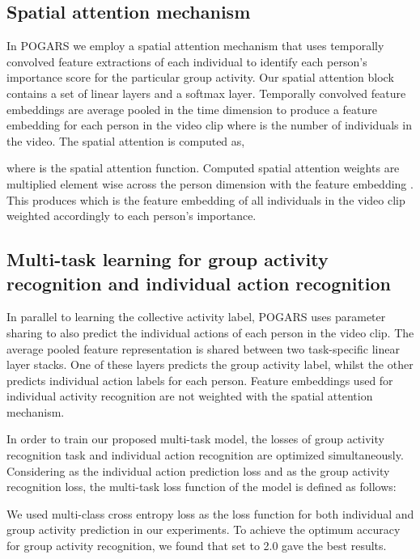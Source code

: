 \documentclass[a4paper,fleqn]{cas-dc}
\begin{document}
\subsection{Spatial attention mechanism}
\label{ssec:spatial-attention-mechanism}

In POGARS we employ a spatial attention mechanism that uses temporally convolved feature extractions of each individual to identify each person's importance score for the particular group activity.
Our spatial attention block contains a set of linear layers and a softmax layer.
Temporally convolved feature embeddings  are average pooled in the time dimension to produce a feature embedding for each person in the video clip {} where  is the number of individuals in the video.
The spatial attention is computed as,



where  is the spatial attention function.
Computed spatial attention weights are multiplied element wise across the person dimension with the feature embedding .
This produces {} which is the feature embedding of all individuals in the video clip weighted accordingly to each person's importance.

\subsection{Multi-task learning for group activity recognition and individual action recognition}
\label{ssec:multi-task-learning}

In parallel to learning the collective activity label, POGARS uses parameter sharing to also predict the individual actions of each person in the video clip.
The average pooled feature representation is shared between two task-specific linear layer stacks.
One of these layers predicts the group activity label, whilst the other predicts individual action labels for each person.
Feature embeddings used for individual activity recognition are not weighted with the spatial attention mechanism.

In order to train our proposed multi-task model, the losses of group activity recognition task and individual action recognition are optimized simultaneously.
Considering  as the individual action prediction loss and  as the group activity recognition loss, the multi-task loss function  of the model is defined as follows:



We used multi-class cross entropy loss as the loss function for both individual and group activity prediction in our experiments.
To achieve the optimum accuracy for group activity recognition, we found that  set to 2.0 gave the best results.
\end{document}

